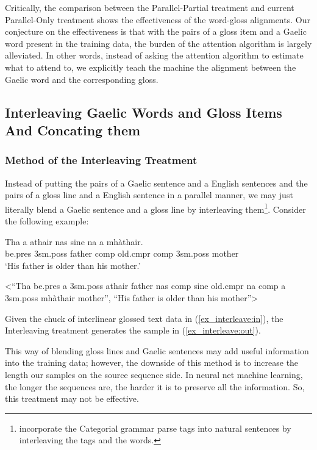\documentclass[11pt,a4paper]{article}
\begin{document}
Critically, the comparison between the Parallel-Partial treatment and current Parallel-Only treatment shows the effectiveness of the word-gloss alignments. Our conjecture on the effectiveness is that with the pairs of a gloss item and a Gaelic word present in the training data, the burden of the attention algorithm \citep{bahdanau2014neural} is largely alleviated. In other words, instead of asking the attention algorithm to estimate what to attend to, we explicitly teach the machine the alignment between the Gaelic word and the corresponding gloss. 

\subsection{Interleaving Gaelic Words and Gloss Items And Concating them}\label{treatment:InterleavingAndConCat}
\subsubsection{Method of the Interleaving Treatment}
Instead of putting the pairs of a Gaelic sentence and a English sentences and the pairs of a gloss line and a English sentence in a parallel manner, we may just literally blend a Gaelic sentence and a gloss line by interleaving them\footnote{\citet{ccg_target_seq} incorporate the Categorial grammar parse tags into natural sentences by interleaving the tags and the words.}. Consider the following example:

\begin{exe} 
\ex 
	\begin{xlist}
	\ex \label{ex_interleave:in}
		\gll	 Tha a athair nas sine na a mh\`athair.\\  
     		     be.pres 3sm.poss father comp old.cmpr comp 3sm.poss mother \\
    	\glt    `His father is older than his mother.'  

    \ex \label{ex_interleave:out} <``Tha be.pres a 3sm.poss athair father nas comp sine old.cmpr na comp a 3sm.poss mh\`athair mother'', ``His father is older than his mother''>
    \end{xlist}
\end{exe}

Given the chuck of interlinear glossed text data in (\ref{ex_interleave:in}), the Interleaving treatment generates the sample in (\ref{ex_interleave:out}).  

This way of blending gloss lines and Gaelic sentences may add useful information into the training data; however, the downside of this method is to increase the length our samples on the source sequence side. In neural net machine learning, the longer the sequences are, the harder it is to preserve all the information. So, this treatment may not be effective. 
\end{document}
